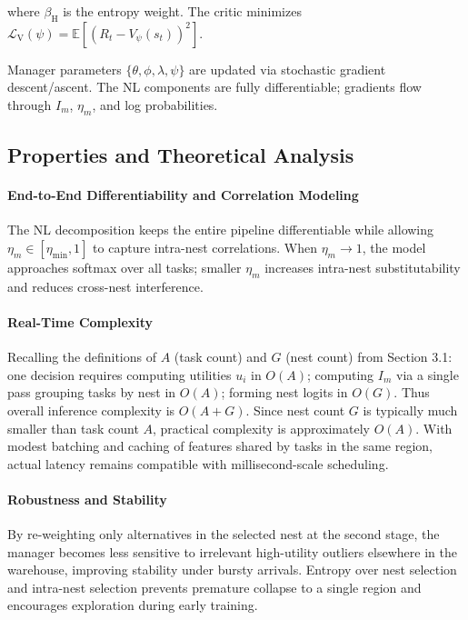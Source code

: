\documentclass[12pt,a4paper]{article}
\begin{document}
where $\beta_{\mathrm{H}}$ is the entropy weight. The critic minimizes $\mathcal{L}_{\mathrm{V}}(\psi) = \mathbb{E}[(R_t - V_\psi(s_t))^2]$.

Manager parameters $\{\theta, \phi, \lambda, \psi\}$ are updated via stochastic gradient descent/ascent. The NL components are fully differentiable; gradients flow through $I_m$, $\eta_m$, and log probabilities.

\subsection{Properties and Theoretical Analysis}

\paragraph{End-to-End Differentiability and Correlation Modeling}

The NL decomposition keeps the entire pipeline differentiable while allowing $\eta_m \in [\eta_{\min}, 1]$ to capture intra-nest correlations. When $\eta_m \to 1$, the model approaches softmax over all tasks; smaller $\eta_m$ increases intra-nest substitutability and reduces cross-nest interference.

\paragraph{Real-Time Complexity}

Recalling the definitions of $A$ (task count) and $G$ (nest count) from Section 3.1: one decision requires computing utilities $u_i$ in $O(A)$; computing $I_m$ via a single pass grouping tasks by nest in $O(A)$; forming nest logits in $O(G)$. Thus overall inference complexity is $O(A+G)$. Since nest count $G$ is typically much smaller than task count $A$, practical complexity is approximately $O(A)$. With modest batching and caching of features shared by tasks in the same region, actual latency remains compatible with millisecond-scale scheduling.

\paragraph{Robustness and Stability}

By re-weighting only alternatives in the selected nest at the second stage, the manager becomes less sensitive to irrelevant high-utility outliers elsewhere in the warehouse, improving stability under bursty arrivals. Entropy over nest selection and intra-nest selection prevents premature collapse to a single region and encourages exploration during early training.
\end{document}
